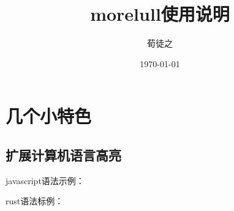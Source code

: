 \documentclass{morelull}
\title{morelull使用说明}
\author{荀徒之}
\date{\today}
\begin{document}
\maketitle
\tableofcontents

\section{几个小特色}
\subsection{扩展计算机语言高亮}

javascript语法示例：



rust语法标例：


\end{document}
